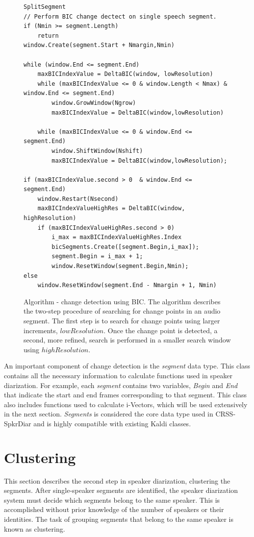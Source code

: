 \begin{figure}
\begin{lstlisting}
SplitSegment
// Perform BIC change dectect on single speech segment.
if (Nmin >= segment.Length) 
	return
window.Create(segment.Start + Nmargin,Nmin)

while (window.End <= segment.End) 
	maxBICIndexValue = DeltaBIC(window, lowResolution)
	while (maxBICIndexValue <= 0 & window.Length < Nmax) & window.End <= segment.End) 
		window.GrowWindow(Ngrow)
		maxBICIndexValue = DeltaBIC(window,lowResolution)
		
	while (maxBICIndexValue <= 0 & window.End <= segment.End) 
		window.ShiftWindow(Nshift)
		maxBICIndexValue = DeltaBIC(window,lowResolution);
	
if (maxBICIndexValue.second > 0  & window.End <= segment.End) 
	window.Restart(Nsecond)
	maxBICIndexValueHighRes = DeltaBIC(window, highResolution)
	if (maxBICIndexValueHighRes.second > 0) 
		i_max = maxBICIndexValueHighRes.Index
		bicSegments.Create([segment.Begin,i_max]);
		segment.Begin = i_max + 1;
		window.ResetWindow(segment.Begin,Nmin);
else 
	window.ResetWindow(segment.End - Nmargin + 1, Nmin)
\end{lstlisting}
\caption{Algorithm - change detection using BIC. The algorithm describes the two-step procedure of searching for change points in an audio segment. The first step is to search for change points using larger increments, $lowResolution$. Once the change point is detected, a second, more refined, search is performed in a smaller search window using $highResolution$.}
\label{alg:changedetection}
\end{figure}

An important component of change detection is the {\it segment} data type. 
This class contains all the necessary information to calculate functions used in speaker diarization. 
For example, each {\it segment} contains two variables, {\it Begin} and {\it End} that indicate the start and end frames corresponding to that segment. 
This class also includes functions used to calculate i-Vectors, which will be used extensively in the next section. 
{\it Segments} is considered the core data type used in CRSS-SpkrDiar and is highly compatible with existing Kaldi classes. 

\newpage
\section{Clustering}
\label{sec:clustering}
This section describes the second step in speaker diarization, clustering the segments. 
After single-speaker segments are identified, the speaker diarization system must decide which segments belong to the same speaker. 
This is accomplished without prior knowledge of the number of speakers or their identities. 
The task of grouping segments that belong to the same speaker is known as clustering. 

